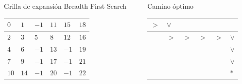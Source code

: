 \begin{frame}
\begin{footnotesize}
    
        \begin{columns}[t]
            \begin{column}{6cm}
                \centering
                Grilla de expansión Breadth-First Search\\
                \begin{tabularx}{6cm}{|X|X|X|X|X|X|}
                    \hline
                    $0$ & $1$ & $-1$ & $11$ & $15$ & $18$ \\
                    \hline
                    $2$ & $3$ & $5$ & $8$ & $12$ & $16$ \\
                    \hline
                    $4$ & $6$ & $-1$ & $13$ & $-1$ & $19$ \\
                    \hline
                    $7$ & $9$ & $-1$ & $17$ & $-1$ & $21$ \\
                    \hline
                    $10$ & $14$ & $-1$ & $20$ & $-1$ & $22$ \\
                    \hline
                \end{tabularx}
            \end{column}
            \begin{column}{6cm}
                \centering
                Camino óptimo
                \begin{tabularx}{6cm}{|X|X|X|X|X|X|}
                    \hline
                    $>$ & $\vee$ & \cellcolor{black} & & & \\
                    \hline
                    & $>$ & $>$ & $>$ & $>$ & $\vee$ \\
                    \hline
                    & & \cellcolor{black} &  & \cellcolor{black} & $\vee$ \\
                    \hline
                    & & \cellcolor{black} &  & \cellcolor{black} & $\vee$ \\
                    \hline
                    & & \cellcolor{black} & & \cellcolor{black} & $*$\\
                    \hline
                \end{tabularx}
            \end{column}
        \end{columns}
    \end{footnotesize}
\end{frame}


